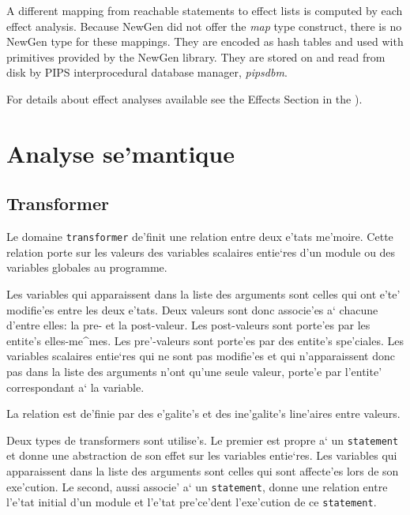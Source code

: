 A different mapping from reachable statements to effect lists is
computed by each effect analysis. Because NewGen did not offer the {\em
map} type construct, there is no NewGen type for these mappings. They
are encoded as hash tables and used with primitives provided by the
NewGen library. They are stored on and read from disk by PIPS
interprocedural database manager, {\em pipsdbm}.

For details about effect analyses available see the Effects Section in the
).

\section{Analyse se'mantique}
\label{semantics}

\subsection{Transformer}
\label{subsection-transformer}

{}

Le domaine {\tt transformer} de'finit une relation entre deux e'tats
me'moire. Cette relation
porte sur les valeurs des variables scalaires entie`res d'un module ou
des variables globales au programme.

Les variables qui apparaissent dans la liste des arguments sont celles
qui ont e'te' modifie'es entre les deux e'tats. Deux valeurs
sont donc associe'es a` chacune d'entre elles: la pre- et la
post-valeur.  Les post-valeurs sont porte'es par les entite's
elles-me^mes. Les pre'-valeurs sont porte'es par des entite's
spe'ciales. Les variables scalaires entie`res qui ne sont pas modifie'es
et qui n'apparaissent donc pas dans la liste des arguments n'ont qu'une
seule valeur, porte'e par l'entite' correspondant a` la variable.

La relation est de'finie par des e'galite's et des ine'galite's
line'aires entre valeurs.

Deux types de transformers sont utilise's. Le premier est propre a` un
{\tt statement} et donne une abstraction de son effet sur les variables
entie`res. Les variables qui apparaissent dans la liste des arguments
sont celles qui sont affecte'es lors de son exe'cution.  Le second,
aussi associe' a` un {\tt statement}, donne une relation entre l'e'tat
initial d'un module et l'e'tat pre'ce'dent l'exe'cution de ce {\tt statement}.

